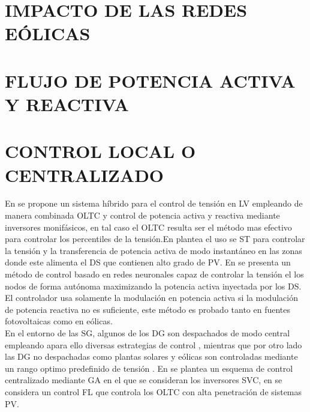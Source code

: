 \documentclass[12pt, letterpaper]{report}
\begin{document}
\section{IMPACTO DE LAS REDES EÓLICAS}


\section{FLUJO DE POTENCIA ACTIVA Y REACTIVA}


\section{CONTROL LOCAL O CENTRALIZADO}
En \cite{Efkarpidis2016} se propone un sistema híbrido para el control de tensión en LV empleando de manera combinada \ac{OLTC} y control de potencia activa y reactiva mediante inversores monifásicos, en tal caso el \ac{OLTC} resulta ser el método mas efectivo para controlar los percentiles de la tensión.En \cite{Colak2015} plantea el uso se \ac{ST} para controlar la tensión y la transferencia de potencia activa de modo instantáneo en las zonas donde este alimenta el \ac{DS}  que contienen alto grado de \ac{PV}. En \cite{Calderaro2014} se presenta un método de control basado en redes neuronales  capaz de controlar la tensión el los nodos de forma autónoma maximizando la potencia activa inyectada por los \ac{DS}. El controlador usa solamente la modulación en potencia activa si la modulación  de potencia reactiva no es suficiente, este método es probado tanto en fuentes fotovoltaicas  como en eólicas.\\  

En el entorno de las \ac{SG}, algunos de los  \ac{DG} son despachados de modo central empleando apara ello diversas estrategias de control , mientras que por otro lado las \ac{DG} no despachadas como plantas solares y eólicas son controladas mediante un rango optimo predefinido de tensión \cite{Vandoorn2013} \cite{colak2015survey}.
En \cite{Oshiro2011a} se plantea un esquema de control centralizado mediante \ac{GA}  en el que se consideran los inversores SVC,  en \cite{Shalwala2011a} se considera un control \ac{FL} que controla los \ac{OLTC}  con alta penetración de sistemas \ac{PV}.
\end{document}
